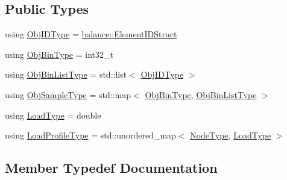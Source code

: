 \subsection*{Public Types}
\begin{DoxyCompactItemize}
\item 
using \hyperlink{structvt_1_1vrt_1_1collection_1_1lb_1_1_greedy_l_b_types_ae22670acd689e4ff83315fac2e4acb5e}{Obj\+I\+D\+Type} = \hyperlink{namespacevt_1_1vrt_1_1collection_1_1balance_a9f5b53fafb270212279a4757d2c4cd28}{balance\+::\+Element\+I\+D\+Struct}
\item 
using \hyperlink{structvt_1_1vrt_1_1collection_1_1lb_1_1_greedy_l_b_types_ae0dc433e9afe6112dd0a7ba402e0d6c2}{Obj\+Bin\+Type} = int32\+\_\+t
\item 
using \hyperlink{structvt_1_1vrt_1_1collection_1_1lb_1_1_greedy_l_b_types_a5f1f5da7ec80da0de64a9d91624c396b}{Obj\+Bin\+List\+Type} = std\+::list$<$ \hyperlink{structvt_1_1vrt_1_1collection_1_1lb_1_1_greedy_l_b_types_ae22670acd689e4ff83315fac2e4acb5e}{Obj\+I\+D\+Type} $>$
\item 
using \hyperlink{structvt_1_1vrt_1_1collection_1_1lb_1_1_greedy_l_b_types_a467f8a79d0785fca5fc95bd5c0f406b9}{Obj\+Sample\+Type} = std\+::map$<$ \hyperlink{structvt_1_1vrt_1_1collection_1_1lb_1_1_greedy_l_b_types_ae0dc433e9afe6112dd0a7ba402e0d6c2}{Obj\+Bin\+Type}, \hyperlink{structvt_1_1vrt_1_1collection_1_1lb_1_1_greedy_l_b_types_a5f1f5da7ec80da0de64a9d91624c396b}{Obj\+Bin\+List\+Type} $>$
\item 
using \hyperlink{structvt_1_1vrt_1_1collection_1_1lb_1_1_greedy_l_b_types_a9fe8829bc0c92e88ddf9d149233a54f4}{Load\+Type} = double
\item 
using \hyperlink{structvt_1_1vrt_1_1collection_1_1lb_1_1_greedy_l_b_types_a8af324cd88e83727178631e4d1478932}{Load\+Profile\+Type} = std\+::unordered\+\_\+map$<$ \hyperlink{namespacevt_a866da9d0efc19c0a1ce79e9e492f47e2}{Node\+Type}, \hyperlink{structvt_1_1vrt_1_1collection_1_1lb_1_1_greedy_l_b_types_a9fe8829bc0c92e88ddf9d149233a54f4}{Load\+Type} $>$
\end{DoxyCompactItemize}


\subsection{Member Typedef Documentation}
\mbox{\label{structvt_1_1vrt_1_1collection_1_1lb_1_1_greedy_l_b_types_a8af324cd88e83727178631e4d1478932}} 
